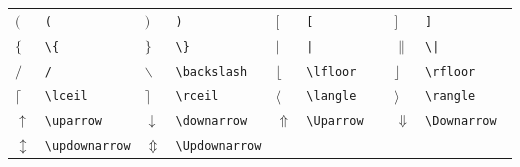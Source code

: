 \documentclass[fleqn]{profmat-cefet}
\begin{document}
\begin{spacing}{1}
\begin{longtable}{p{3mm}p{28mm}p{3mm}p{28mm}p{3mm}p{28mm}p{3mm}p{28mm}} \hline
  $(           $ & \lstinline!(           ! & 
  $)           $ & \lstinline!)           ! &
  $[           $ & \lstinline![           ! & 
  $]           $ & \lstinline!]           ! \\
  $\{          $ & \lstinline!\{          ! &
  $\}          $ & \lstinline!\}          ! &
  $|           $ & \lstinline!|           ! &
  $\|          $ & \lstinline!\|          ! \\
  $/           $ & \lstinline!/           ! &
  $\backslash  $ & \lstinline!\backslash  ! &
  $\lfloor     $ & \lstinline!\lfloor     ! &
  $\rfloor     $ & \lstinline!\rfloor     ! \\
  $\lceil      $ & \lstinline!\lceil      ! &
  $\rceil      $ & \lstinline!\rceil      ! &
  $\langle     $ & \lstinline!\langle     ! &
  $\rangle     $ & \lstinline!\rangle     ! \\
  $\uparrow    $ & \lstinline!\uparrow    ! &
  $\downarrow  $ & \lstinline!\downarrow  ! &
  $\Uparrow    $ & \lstinline!\Uparrow    ! &
  $\Downarrow  $ & \lstinline!\Downarrow  ! \\
  $\updownarrow$ & \lstinline!\updownarrow! &
  $\Updownarrow$ & \lstinline!\Updownarrow! \\ \hline
\end{longtable}


\end{spacing}
\end{document}
